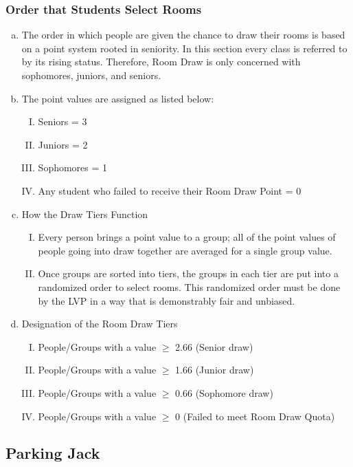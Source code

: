 \documentclass[USletter,12pt]{article}
\begin{document}
\subsubsection{Order that Students Select Rooms}
\begin{enumerate}[(a)]
\item The order in which people are given the chance to draw their rooms is based on a point system rooted in seniority.  In this section every class is referred to by its rising status.  Therefore, Room Draw is only concerned with sophomores, juniors, and seniors.
\item The point values are assigned as listed below:
	\begin{enumerate}[(I)]
	\item Seniors = 3
	\item Juniors = 2
	\item Sophomores = 1
	\item Any student who failed to receive their Room Draw Point = 0
	\end{enumerate}
\item How the Draw Tiers Function
	\begin{enumerate}[(I)]
	\item Every person brings a point value to a group; all of the point values of people going into draw together are averaged for a single group value.
	\item Once groups are sorted into tiers, the groups in each tier are put into a randomized order to select rooms. This randomized order must be done by the LVP in a way that is demonstrably fair and unbiased.
	\end{enumerate}
\item Designation of the Room Draw Tiers
	\begin{enumerate}[(I)]
	\item People/Groups with a value $\ge$ 2.66 (Senior draw)
	\item People/Groups with a value $\ge$ 1.66 (Junior draw)
	\item People/Groups with a value $\ge$ 0.66 (Sophomore draw)
	\item People/Groups with a value $\ge$ 0 (Failed to meet Room Draw Quota)
	\end{enumerate}
\end{enumerate}


\subsection{Parking Jack}
\end{document}
